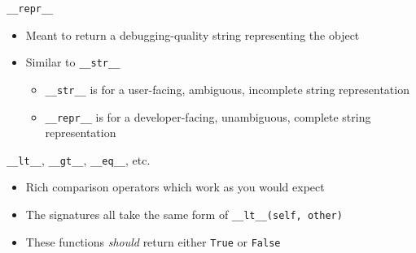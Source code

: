 \documentclass[aspectratio=169,xcolor=dvipsnames]{beamer}
\begin{document}
\begin{frame}{\texttt{\_\_repr\_\_}}
  \begin{itemize}
    \item Meant to return a debugging-quality string representing the object
    \item Similar to \texttt{\_\_str\_\_}
    \begin{itemize}
      \item \texttt{\_\_str\_\_} is for a user-facing, ambiguous, incomplete string representation
      \item \texttt{\_\_repr\_\_} is for a developer-facing, unambiguous, complete string representation
    \end{itemize}
  \end{itemize}
  \begin{example}
    
  \end{example}
\end{frame}


\begin{frame}{\texttt{\_\_lt\_\_}, \texttt{\_\_gt\_\_}, \texttt{\_\_eq\_\_}, etc.}
  \begin{itemize}
    \item Rich comparison operators which work as you would expect
    \item The signatures all take the same form of \texttt{\_\_lt\_\_(self, other)}
    \item These functions \textit{should} return either \texttt{True} or \texttt{False}
  \end{itemize}
  \begin{example}
    
  \end{example}
\end{frame}

\end{document}
